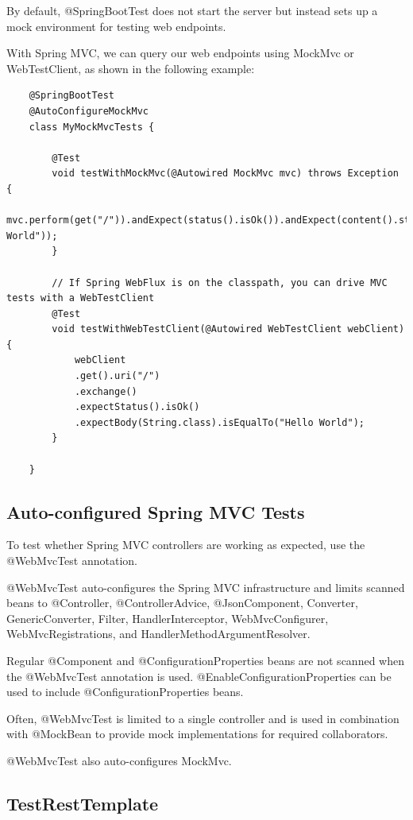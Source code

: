 \documentclass{scrartcl}
\begin{document}
By default, @SpringBootTest does not start the server but instead sets up a mock environment for testing web endpoints.

With Spring MVC, we can query our web endpoints using MockMvc or WebTestClient, as shown in the following example:

\begin{lstlisting}
    @SpringBootTest
    @AutoConfigureMockMvc
    class MyMockMvcTests {

        @Test
        void testWithMockMvc(@Autowired MockMvc mvc) throws Exception {
            mvc.perform(get("/")).andExpect(status().isOk()).andExpect(content().string("Hello World"));
        }

        // If Spring WebFlux is on the classpath, you can drive MVC tests with a WebTestClient
        @Test
        void testWithWebTestClient(@Autowired WebTestClient webClient) {
            webClient
            .get().uri("/")
            .exchange()
            .expectStatus().isOk()
            .expectBody(String.class).isEqualTo("Hello World");
        }

    }

\end{lstlisting}

\subsection{Auto-configured Spring MVC Tests}

To test whether Spring MVC controllers are working as expected, use the @WebMvcTest annotation.

@WebMvcTest auto-configures the Spring MVC infrastructure and limits scanned beans to @Controller, @ControllerAdvice, @JsonComponent, Converter, GenericConverter, Filter, HandlerInterceptor, WebMvcConfigurer, WebMvcRegistrations, and HandlerMethodArgumentResolver.

Regular @Component and @ConfigurationProperties beans are not scanned when the @WebMvcTest annotation is used. @EnableConfigurationProperties can be used to include @ConfigurationProperties beans.

Often, @WebMvcTest is limited to a single controller and is used in combination with @MockBean to provide mock implementations for required collaborators.

@WebMvcTest also auto-configures MockMvc.

\subsection{TestRestTemplate}
\end{document}

